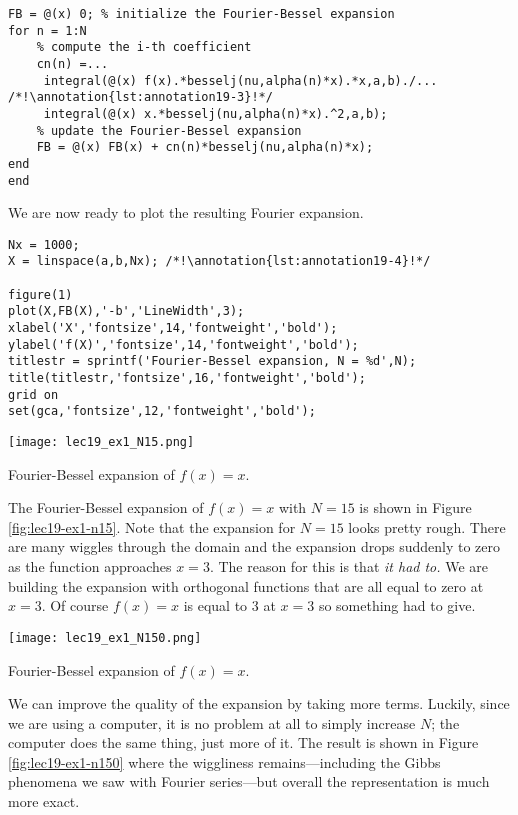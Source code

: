 \begin{enumerate}
\begin{lstlisting}[name=lec19_ex,style=myMatlab]
FB = @(x) 0; % initialize the Fourier-Bessel expansion
for n = 1:N
    % compute the i-th coefficient
    cn(n) =...
     integral(@(x) f(x).*besselj(nu,alpha(n)*x).*x,a,b)./... /*!\annotation{lst:annotation19-3}!*/
     integral(@(x) x.*besselj(nu,alpha(n)*x).^2,a,b);
    % update the Fourier-Bessel expansion
    FB = @(x) FB(x) + cn(n)*besselj(nu,alpha(n)*x); 
end
end
\end{lstlisting}
\end{enumerate}
We are now ready to plot the resulting Fourier expansion.

\begin{lstlisting}[name=lec19_ex,style=myMatlab]
Nx = 1000;
X = linspace(a,b,Nx); /*!\annotation{lst:annotation19-4}!*/

figure(1)
plot(X,FB(X),'-b','LineWidth',3);
xlabel('X','fontsize',14,'fontweight','bold');
ylabel('f(X)','fontsize',14,'fontweight','bold');
titlestr = sprintf('Fourier-Bessel expansion, N = %d',N);
title(titlestr,'fontsize',16,'fontweight','bold');
grid on
set(gca,'fontsize',12,'fontweight','bold');

\end{lstlisting}
\begin{marginfigure}
\texttt{[image: lec19\_ex1\_N15.png]}
\caption{Fourier-Bessel expansion of $f(x)=x$.}
\label{fig:lec19-ex1-n15}
\end{marginfigure}
The Fourier-Bessel expansion of $f(x)=x$ with $N=15$ is shown in Figure \ref{fig:lec19-ex1-n15}.  Note that the expansion for $N=15$ looks pretty rough. There are many wiggles through the domain and the expansion drops suddenly to zero as the function approaches $x=3$.  The reason for this is that \emph{it had to.}  We are building the expansion with orthogonal functions that are all equal to zero at $x=3$.  Of course $f(x)=x$ is equal to 3 at $x=3$ so something had to give.  

\begin{marginfigure}
\texttt{[image: lec19\_ex1\_N150.png]}
\caption{Fourier-Bessel expansion of $f(x)=x$.}
\label{fig:lec19-ex1-n150}
\end{marginfigure}
We can improve the quality of the expansion by taking more terms.  Luckily, since we are using a computer, it is no problem at all to simply increase $N$; the computer does the same thing, just more of it.  The result is shown in Figure \ref{fig:lec19-ex1-n150} where the wiggliness remains---including the Gibbs phenomena we saw with Fourier series---but overall the representation is much more exact.

